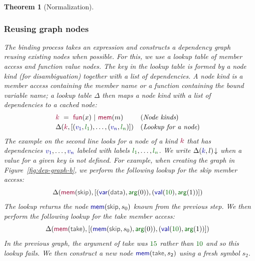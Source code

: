 \documentclass[acmsmall,anonymous,fleqn]{acmart}\settopmatter{printfolios=false,printccs=false,printacmref=false}
\newcounter{thc}
\theoremstyle{plain}
\newtheorem{theorem}[thc]{Theorem}
\theoremstyle{definition}
\newcommand{\num}[1]{\textcolor{numclr}{#1}}
\newcommand{\ident}[1]{\textnormal{\textcolor{idclr}{\sffamily #1}}}
\newcommand{\bndclr}[1]{\textcolor{kvdclr}{#1}}
\newcommand{\bkndclr}[1]{\textcolor{prepclr}{#1}}
\newcommand{\blblclr}[1]{\textcolor{numclr}{#1}}
\newcommand{\bnd}[1]{\textnormal{\textcolor{kvdclr}{\sffamily #1}}}
\newcommand{\bknd}[1]{\textnormal{\textcolor{prepclr}{\sffamily #1}}}
\newcommand{\blbl}[1]{\textnormal{\textcolor{numclr}{\sffamily #1}}}
\begin{document}
\begin{theorem}[Normalization]

\subsubsection{Reusing graph nodes}
The binding process takes an expression and constructs a dependency graph reusing existing nodes
when possible. For this, we use a lookup table of member access and function value nodes. The key
in the lookup table is formed by a node kind (for disambiguation) together with a list of
dependencies. A node kind is a member access containing the member name or a function containing
the bound variable name; a lookup table $\Delta$ then maps a node kind with a list of dependencies
to a cached node:
%
\begin{equation*}
\begin{array}{ll}
\bkndclr{k}~=~\bknd{fun}(x)~|~\bknd{mem}(m)&(\textit{Node kinds})\\[0.2em]
\Delta(\bkndclr{k}, [(\bndclr{v_1},\blblclr{l_1}), \ldots, (\bndclr{v_n},\blblclr{l_n})])  & (\textit{Lookup for a node})
\end{array}
\end{equation*}
%
The example on the second line looks for a node of a kind $\bkndclr{k}$ that has dependencies
$\bndclr{v_1}, \ldots, \bndclr{v_n}$ labeled with labels $\blblclr{l_1}, \ldots, \blblclr{l_n}$.
We write $\Delta(\bndclr{k}, l)\!\downarrow$ when a value for a given key is not defined.
For example, when creating the graph in Figure~\ref{fig:dep-graph-b},
we perform the following lookup for the \ident{skip} member access:
%
\[ \Delta(\bknd{mem}(\ident{skip}), [(\bnd{var}(\ident{data}),\blbl{arg}(0)), (\bnd{val}(\num{10}), \blbl{arg}(1))]) \]
%
The lookup returns the node $\bnd{mem}(\ident{skip}, s_0)$ known from the previous step. We then perform
the following lookup for the \ident{take} member access:
%
\[ \Delta(\bknd{mem}(\ident{take}), [(\bnd{mem}(\ident{skip}, s_0),\blbl{arg}(0)), (\bnd{val}(\num{10}), \blbl{arg}(1))]) \]
%
In the previous graph, the argument of \ident{take} was $\num{15}$ rather than $\num{10}$ and so
this lookup fails. We then construct a new node $\bnd{mem}(\ident{take}, s_2)$ using a fresh
symbol $s_2$.



\end{theorem}
\end{document}
